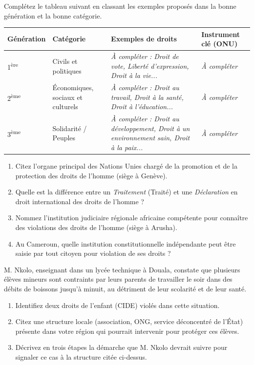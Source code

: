 \documentclass[11pt]{article}
\begin{document}
\begin{exercice}
Complétez le tableau suivant en classant les exemples proposés dans la bonne génération et la bonne catégorie.

\begin{tabular}{|p{3.5cm}|p{3.5cm}|p{3.5cm}|p{3.5cm}|}
\hline
\textbf{Génération} & \textbf{Catégorie} & \textbf{Exemples de droits} & \textbf{Instrument clé (ONU)} \\
\hline
1\textsuperscript{ère} & Civils et politiques & \textit{À compléter : Droit de vote, Liberté d'expression, Droit à la vie...} & \textit{À compléter} \\
\hline
2\textsuperscript{ème} & Économiques, sociaux et culturels & \textit{À compléter : Droit au travail, Droit à la santé, Droit à l'éducation...} & \textit{À compléter} \\
\hline
3\textsuperscript{ème} & Solidarité / Peuples & \textit{À compléter : Droit au développement, Droit à un environnement sain, Droit à la paix...} & \textit{À compléter} \\
\hline
\end{tabular}
\end{exercice}

\begin{exercice}
\begin{enumerate}
    \item Citez l'organe principal des Nations Unies chargé de la promotion et de la protection des droits de l'homme (siège à Genève).
    \item Quelle est la différence entre un \textit{Traitement} (Traité) et une \textit{Déclaration} en droit international des droits de l'homme ?
    \item Nommez l'institution judiciaire régionale africaine compétente pour connaître des violations des droits de l'homme (siège à Arusha).
    \item Au Cameroun, quelle institution constitutionnelle indépendante peut être saisie par tout citoyen pour violation de ses droits ?
\end{enumerate}
\end{exercice}

\begin{exercice}
M. Nkolo, enseignant dans un lycée technique à Douala, constate que plusieurs élèves mineurs sont contraints par leurs parents de travailler le soir dans des débits de boissons jusqu'à minuit, au détriment de leur scolarité et de leur santé.

\begin{enumerate}
    \item Identifiez deux droits de l'enfant (CIDE) violés dans cette situation.
    \item Citez une structure locale (association, ONG, service déconcentré de l'État) présente dans votre région qui pourrait intervenir pour protéger ces élèves.
    \item Décrivez en trois étapes la démarche que M. Nkolo devrait suivre pour signaler ce cas à la structure citée ci-dessus.
\end{enumerate}
\end{exercice}
\end{document}
